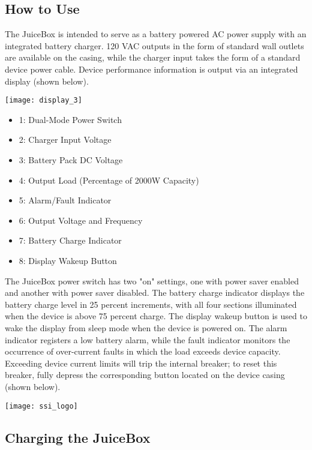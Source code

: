 \documentclass[../jb_user_manual.tex]{subfiles}
\begin{document}
\subsection{\Large{How to Use}} 

The JuiceBox is intended to serve as a battery powered AC power supply with an integrated battery charger.  120 VAC outputs in the form of standard wall outlets are available on the casing, while the charger input takes the form of a standard device power cable.  Device performance information is output via an integrated display (shown below).

\vspace{3mm}
\texttt{[image: display\_3]}
\vspace{3mm}

\begin{itemize}
	\item{1: Dual-Mode Power Switch}
	\item{2: Charger Input Voltage}
	\item{3: Battery Pack DC Voltage}
	\item{4: Output Load (Percentage of 2000W Capacity)}
	\item{5: Alarm/Fault Indicator}
	\item{6: Output Voltage and Frequency}
	\item{7: Battery Charge Indicator}
	\item{8: Display Wakeup Button}
\end{itemize}

The JuiceBox power switch has two "on" settings, one with power saver enabled and another with power saver disabled.  The battery charge indicator displays the battery charge level in 25 percent increments, with all four sections illuminated when the device is above 75 percent charge.  The display wakeup button is used to wake the display from sleep mode when the device is powered on.  The alarm indicator registers a low battery alarm, while the fault indicator monitors the occurrence of over-current faults in which the load exceeds device capacity.  Exceeding device current limits will trip the internal breaker; to reset this breaker, fully depress the corresponding button located on the device casing (shown below).

\vspace{3mm}
\texttt{[image: ssi\_logo]}
\vspace{3mm}

\subsection{\Large{Charging the JuiceBox}}
\end{document}
